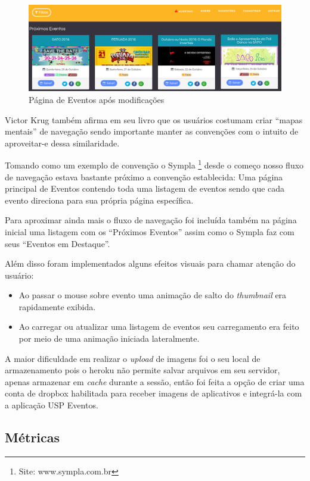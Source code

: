 \begin{figure}[htb]
\centering
\includegraphics[width=15cm]{figuras/events_page_3aiteracao}
\caption{\label{fig:events_page_3aiteracao} Página de Eventos após modificações}
\end{figure}
	\par Victor Krug também afirma em seu livro que os usuários costumam criar ``mapas mentais'' de navegação sendo importante manter as convenções com o intuito de aproveitar-e dessa similaridade.
	\par Tomando como um exemplo de convenção o Sympla \footnote{Site: www.sympla.com.br} desde o começo nosso fluxo de navegação estava bastante próximo a convenção establecida: Uma página principal de Eventos contendo toda uma listagem de eventos sendo que cada evento direciona para sua própria página específica.
	\par Para aproximar ainda mais o fluxo de navegação foi incluída também na página inicial uma listagem com os ``Próximos Eventos'' assim como o Sympla faz com seus ``Eventos em Destaque''.
	\par Além disso foram implementados alguns efeitos visuais para chamar atenção do usuário:
	\begin{itemize}
	\item Ao passar o mouse sobre evento uma animação de salto do \emph{thumbnail} era rapidamente exibida.
	\item Ao carregar ou atualizar uma listagem de eventos seu carregamento era feito por meio de uma animação iniciada lateralmente.
	\end{itemize}
	\par A maior dificuldade em realizar o \emph{upload} de imagens foi o seu local de armazenamento pois o heroku não permite salvar arquivos em seu servidor, apenas armazenar em \emph{cache} durante a sessão, então foi feita a opção de criar uma conta de dropbox habilitada para receber imagens de aplicativos e integrá-la com a aplicação USP Eventos.

\subsection{Métricas}

